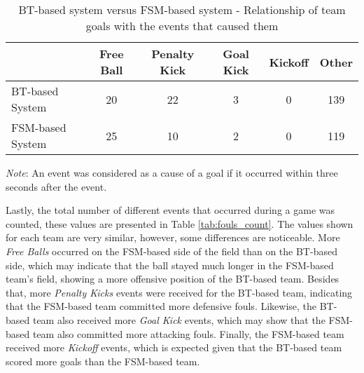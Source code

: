 \begin{table}[h]
    \begin{minipage}{\columnwidth}
        \centering
        \begin{tabular}{l c c c c c}
            \toprule
                             & Free Ball & Penalty Kick & Goal Kick & Kickoff & Other \\
            \midrule
            BT-based System  & 20        & 22           & 3         & 0       & 139   \\
            FSM-based System & 25        & 10           & 2         & 0       & 119   \\
            \bottomrule
        \end{tabular}
        \begin{center}
            \footnotesize
            \emph{Note}: An event was considered as a cause of a goal if it occurred within three seconds after the event.
        \end{center}
    \end{minipage}
    \caption{BT-based system versus FSM-based system - Relationship of team goals with the events that caused them}
    \label{tab:goals_reasons}
\end{table}

Lastly, the total number of different events that occurred during a game was counted, these values are presented in Table \ref{tab:fouls_count}. The values shown for each team are very similar, however, some differences are noticeable. More \textit{Free Balls} occurred on the FSM-based side of the field than on the BT-based side, which may indicate that the ball stayed much longer in the FSM-based team's field, showing a more offensive position of the BT-based team. Besides that, more \textit{Penalty Kicks} events were received for the BT-based team, indicating that the FSM-based team committed more defensive fouls. Likewise, the BT-based team also received more \textit{Goal Kick} events, which may show that the FSM-based team also committed more attacking fouls. Finally, the FSM-based team received more \textit{Kickoff} events, which is expected given that the BT-based team scored more goals than the FSM-based team.

